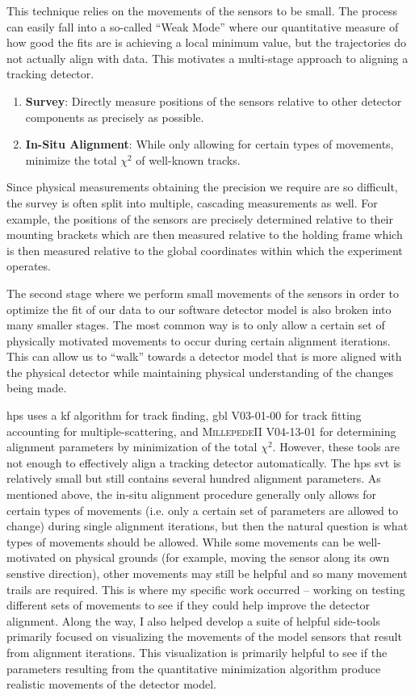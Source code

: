 This technique relies on the movements of the sensors to be small.
The process can easily fall into a so-called ``Weak Mode'' where our quantitative measure of
how good the fits are is achieving a local minimum value, but the trajectories do not actually
align with data.
This motivates a multi-stage approach to aligning a tracking detector.

\begin{enumerate}
  \item \textbf{Survey}: Directly measure positions of the sensors relative to other
        detector components as precisely as possible.
  \item \textbf{In-Situ Alignment}: While only allowing for certain types of movements,
        minimize the total $\chi^2$ of well-known tracks.
\end{enumerate}

Since physical measurements obtaining the precision we require are so difficult, the survey is
often split into multiple, cascading measurements as well.
For example, the positions of the sensors are precisely determined relative to their mounting
brackets which are then measured relative to the holding frame which is then measured relative
to the global coordinates within which the experiment operates.

The second stage where we perform small movements of the sensors in order to optimize the fit of
our data to our software detector model is also broken into many smaller stages.
The most common way is to only allow a certain set of physically motivated movements to occur
during certain alignment iterations.
This can allow us to ``walk'' towards a detector model that is more aligned
with the physical detector while maintaining physical understanding of the changes being made.

\ac{hps} uses a \ac{kf} algorithm for track finding,
\ac{gbl} \cite{gbl-2012} V03-01-00 for track fitting accounting for multiple-scattering,
and \textsc{MillepedeII} \cite{millepede-2011} V04-13-01 for determining alignment parameters
by minimization of the total $\chi^2$.
However, these tools are not enough to effectively align a tracking detector automatically.
The \ac{hps} \ac{svt} is relatively small but still contains several hundred alignment parameters.
As mentioned above, the in-situ alignment procedure generally only allows for certain types
of movements (i.e. only a certain set of parameters are allowed to change) during single
alignment iterations, but then the natural question is what types of movements should be allowed.
While some movements can be well-motivated on physical grounds (for example, moving the sensor
along its own senstive direction), other movements may still be helpful and so many movement trails
are required.
This is where my specific work occurred -- working on testing different
sets of movements to see if they could help improve the detector alignment.
Along the way, I also helped develop a suite of helpful side-tools primarily focused
on visualizing the movements of the model sensors that result from alignment iterations.
This visualization is primarily helpful to see if the parameters resulting from the quantitative
minimization algorithm produce realistic movements of the detector model.

